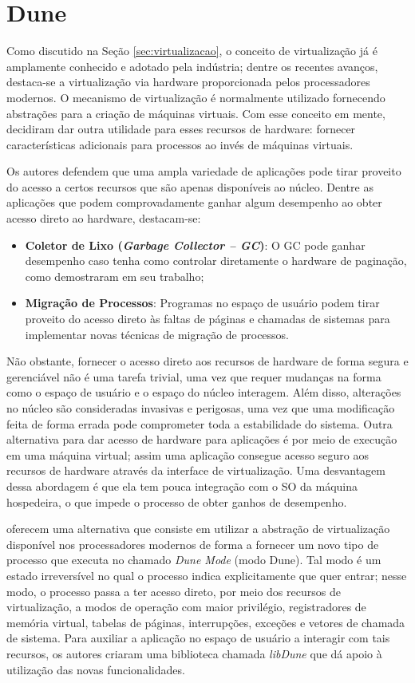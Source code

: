 \section{Dune}
\label{sec:dune}

Como discutido na Seção \ref{sec:virtualizacao}, o conceito de virtualização já
é amplamente conhecido e adotado pela indústria; dentre os recentes avanços,
destaca-se a virtualização via hardware proporcionada pelos processadores
modernos. O mecanismo de virtualização é normalmente utilizado fornecendo
abstrações para a criação de máquinas virtuais. Com esse conceito em mente,
\citet{belay} decidiram dar outra utilidade para esses recursos de hardware:
fornecer características adicionais para processos ao invés de máquinas
virtuais.

Os autores defendem que uma ampla variedade de aplicações pode tirar proveito
do acesso a certos recursos que são apenas disponíveis ao núcleo. Dentre as
aplicações que podem comprovadamente ganhar algum desempenho ao obter acesso
direto ao hardware, destacam-se:

\begin{itemize}
  \item \textbf{Coletor de Lixo (\emph{Garbage Collector -- GC})}: O GC pode ganhar desempenho caso
        tenha como controlar diretamente o hardware de paginação, como
        \citet{pauseless} demostraram em seu trabalho;
  \item \textbf{Migração de Processos}: Programas no espaço de usuário podem tirar
        proveito do acesso direto às faltas de páginas e chamadas de sistemas para
        implementar novas técnicas de migração de processos.
\end{itemize}

Não obstante, fornecer o acesso direto aos recursos de hardware de forma segura
e gerenciável não é uma tarefa trivial, uma vez que requer mudanças na forma
como o espaço de usuário e o espaço do núcleo interagem. Além disso, alterações
no núcleo são consideradas invasivas e perigosas, uma vez que uma modificação
feita de forma errada pode comprometer toda a estabilidade do sistema. Outra
alternativa para dar acesso de hardware para aplicações é por meio de execução
em uma máquina virtual; assim uma aplicação consegue acesso seguro aos recursos
de hardware através da interface de virtualização. Uma desvantagem dessa
abordagem é que ela tem pouca integração com o SO da máquina hospedeira, o que
impede o processo de obter ganhos de desempenho.

\citet{belay} oferecem uma alternativa que consiste em utilizar a abstração de
virtualização disponível nos processadores modernos de forma a fornecer um novo
tipo de processo que executa no chamado \emph{Dune Mode} (modo Dune). Tal modo
é um estado irreversível no qual o processo indica explicitamente que quer
entrar; nesse modo, o processo passa a ter acesso direto, por meio dos recursos
de virtualização, a modos de operação com maior privilégio, registradores de
memória virtual, tabelas de páginas, interrupções, exceções e vetores de
chamada de sistema. Para auxiliar a aplicação no espaço de usuário a interagir
com tais recursos, os autores criaram uma biblioteca chamada \emph{libDune} que
dá apoio à utilização das novas funcionalidades.

